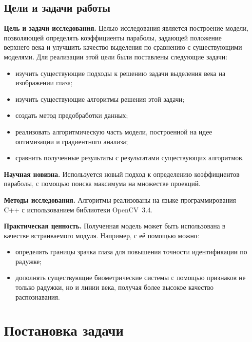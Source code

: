 \documentclass[12pt,a4paper]{article} %
\begin{document}
\newpage
\subsection{Цели и задачи работы}

\textbf{Цель и задачи исследования.} Целью исследования является построение модели, позволяющей определять коэффициенты параболы, задающей положение верхнего века и улучшить качество выделения по сравнению с существующими моделями. Для реализации этой цели были поставлены следующие задачи:
\begin{itemize}
	\item изучить существующие подходы к решению задачи выделения века на изображении глаза;
	\item изучить существующие алгоритмы решения этой задачи;
	\item создать метод предобработки данных;
	\item реализовать алгоритмическую часть модели, построенной на идее оптимизации и градиентного анализа;
	\item сравнить полученные результаты с результатами существующих алгоритмов.
\end{itemize}

\bigskip

\textbf{Научная новизна.} Используется новый подход к определению коэффициентов параболы, с помощью поиска максимума на множестве проекций.

\bigskip

\textbf{Методы исследования.} Алгоритмы реализованы на языке программирования C++ с использованием библиотеки OpenCV~3.4.

\bigskip

\textbf{Практическая ценность.} Полученная модель может быть использована в качестве встраиваемого модуля. Например, с её помощью можно:
\begin{itemize}
	\item определять границы зрачка глаза для повышения точности идентификации по радужке;
	\item дополнять существующие биометрические системы с помощью признаков не только радужки, но и линии века, получая более высокое качество распознавания.
\end{itemize}


\newpage
\section{Постановка задачи}
\end{document}
